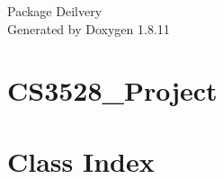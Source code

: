 \documentclass[twoside]{book}
\newcommand{\+}{\discretionary{\mbox{\scriptsize$\hookleftarrow$}}{}{}}
\newcommand{\clearemptydoublepage}{%
  \newpage{\pagestyle{empty}\cleardoublepage}%
}
\begin{document}
\hypersetup{pageanchor=false,
             bookmarksnumbered=true,
             pdfencoding=unicode
            }
\begin{titlepage}
\vspace*{7cm}
\begin{center}%
{\Large Package Deilvery }\\
\vspace*{1cm}
{\large Generated by Doxygen 1.8.11}\\
\end{center}
\end{titlepage}
\clearemptydoublepage
\tableofcontents
\clearemptydoublepage
{}
\hypersetup{pageanchor=true}

\chapter{C\+S3528\+\_\+\+Project}
\label{md_README}
\hypertarget{md_README}{}

\chapter{Class Index}

\end{document}
